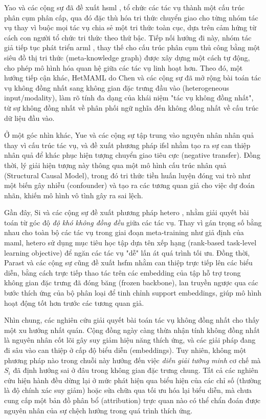 Yao và các cộng sự đã đề xuất \acrfull{hsml} \cite{yao2019hierarchically}, tổ chức các tác vụ thành một cấu trúc phân cụm phân cấp, qua đó đặc thù hóa tri thức chuyển giao cho từng nhóm tác vụ thay vì buộc mọi tác vụ chia sẻ một tri thức toàn cục, dựa trên cảm hứng từ cách con người tổ chức tri thức theo thứ bậc. Tiếp nối hướng đi này, nhóm tác giả tiếp tục phát triển \acrfull{arml} \cite{yao2020automated}, thay thế cho cấu trúc phân cụm thủ công bằng một siêu đồ thị tri thức (meta-knowledge graph) được xây dựng một cách tự động, cho phép mô hình hóa quan hệ giữa các tác vụ linh hoạt hơn. Theo đó, một hướng tiếp cận khác, HetMAML do Chen và các cộng sự \cite{chen2021hetmaml} đã mở rộng bài toán tác vụ không đồng nhất sang không gian đặc trưng đầu vào (heterogeneous input/modality), làm rõ tính đa dạng của khái niệm "tác vụ không đồng nhất", từ sự không đồng nhất về phân phối ngữ nghĩa đến không đồng nhất về cấu trúc dữ liệu đầu vào.

Ở một góc nhìn khác, Yue và các cộng sự tập trung vào nguyên nhân nhân quả thay vì cấu trúc tác vụ, và đề xuất phương pháp \acrfull{ifsl} \cite{yue2020interventional} nhằm tạo ra sự can thiệp nhân quả để khác phục hiện tượng chuyển giao tiêu cực (negative transfer). Đồng thời, lý giải hiện tượng này thông qua một mô hình cấu trúc nhân quả (Structural Causal Model), trong đó tri thức tiền huấn luyện đóng vai trò như một biến gây nhiễu (confounder) và tạo ra các tương quan giả cho việc dự đoán nhãn, khiến mô hình vô tình gây ra sai lệch. 

Gần đây, Si và các cộng sự đề xuất phương pháp \acrfull{hetero} \cite{si2025meta}, nhằm giải quyết bài toán từ góc độ \emph{độ khó không đồng đều} giữa các tác vụ. Thay vì gán trọng số bằng nhau cho toàn bộ các tác vụ trong giai đoạn meta-training như giả định của \acrshort{maml}, \acrshort{hetero} sử dụng mục tiêu học tập dựa tên xếp hạng (rank-based task-level learning objective) để ngăn các tác vụ "dễ" lấn át quá trình tối ưu. Đồng thời, Parast và các cộng sự cũng đề xuất \acrfull{hsfm} \cite{parast2026hsfm} nhằm can thiệp trực tiếp lên các biểu diễn, bằng cách trực tiếp thao tác trên các embedding của tập hỗ trợ trong không gian đặc trưng đã đóng băng (frozen backbone), lan truyền ngược qua các bước thích ứng của bộ phân loại để tinh chỉnh support embeddings, giúp mô hình hoạt động tốt hơn trước các tương quan giả.

Nhìn chung, các nghiên cứu giải quyết bài toán tác vụ không đồng nhất cho thấy một xu hướng nhất quán. Cộng đồng ngày càng thừa nhận tính không đồng nhất là nguyên nhân cốt lõi gây suy giảm hiệu năng thích ứng, và các giải pháp đang đi sâu vào can thiệp ở cấp độ biểu diễn (embeddings). Tuy nhiên, không một phương pháp nào trong chuỗi này hướng đến việc \emph{diễn giải tường minh} cơ chế mà $S_i$ đã định hướng sai ở đâu trong không gian đặc trưng chung. Tất cả các nghiên cứu hiện hành đều dừng lại ở mức phát hiện qua biểu hiện của các chỉ số (thường là độ chính xác suy giảm) hoặc sửa chữa qua tối ưu hóa lại biểu diễn, mà chưa cung cấp một bản đồ phân bổ (attribution) trực quan nào có thể chẩn đoán được nguyên nhân của sự chệch hướng trong quá trình thích ứng.


